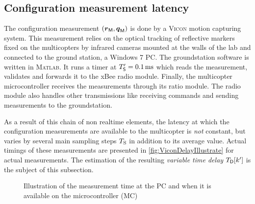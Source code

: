 

\subsection{Configuration measurement latency}
The configuration measurement $(\boldsymbol{r}_{\mathsf{M}}, \boldsymbol{q}_{\mathsf{M}})$ is done by a \textsc{Vicon} motion capturing system.
This measurement relies on the optical tracking of reflective markers fixed on the multicopters by infrared cameras mounted at the walls of the lab and connected to the ground station, a Windows 7 PC.
The groundstation software is written in \textsc{Matlab}.
It runs a timer at $T'_{\mathsf{S}} = 0.1\,\text{ms}$ which reads the measurement, validates and forwards it to the xBee radio module.
Finally, the multicopter microcontroller receives the measurements through its ratio module.
The radio module also handles other transmissions like receiving commands and sending measurements to the groundstation.

As a result of this chain of non realtime elements, the latency at which the configuration measurements are available to the multicopter is \textit{not} constant, but varies by several main sampling steps $T_{\mathrm{S}}$ in addition to its average value.
Actual timings of these measurements are presented in \autoref{fig:ViconDelayIllustrate} for actual measurements.
The estimation of the resulting \textit{variable time delay} $T_{\mathsf{D}}[k']$ is the subject of this subsection.

\begin{figure}[htb]
 \centering
 
 \caption{Illustration of the measurement time at the PC and when it is available on the microcontroller (MC)}
 \label{fig:ViconDelayClocks}
\end{figure}

